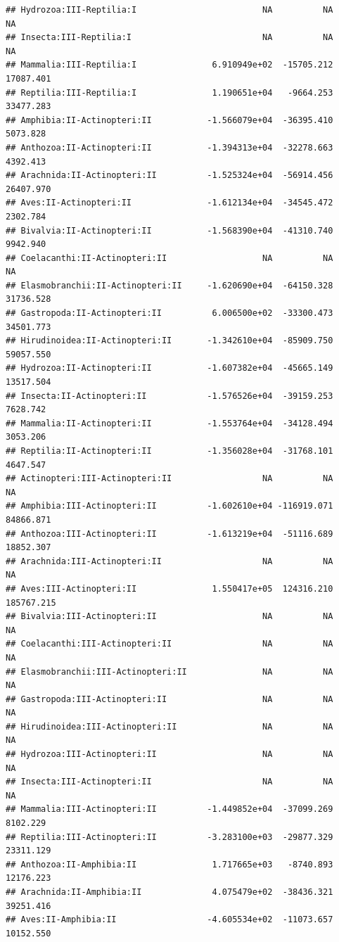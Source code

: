 \documentclass[
  12pt,
]{article}
\begin{document}
\begin{verbatim}
## Hydrozoa:III-Reptilia:I                         NA          NA          NA
## Insecta:III-Reptilia:I                          NA          NA          NA
## Mammalia:III-Reptilia:I               6.910949e+02  -15705.212   17087.401
## Reptilia:III-Reptilia:I               1.190651e+04   -9664.253   33477.283
## Amphibia:II-Actinopteri:II           -1.566079e+04  -36395.410    5073.828
## Anthozoa:II-Actinopteri:II           -1.394313e+04  -32278.663    4392.413
## Arachnida:II-Actinopteri:II          -1.525324e+04  -56914.456   26407.970
## Aves:II-Actinopteri:II               -1.612134e+04  -34545.472    2302.784
## Bivalvia:II-Actinopteri:II           -1.568390e+04  -41310.740    9942.940
## Coelacanthi:II-Actinopteri:II                   NA          NA          NA
## Elasmobranchii:II-Actinopteri:II     -1.620690e+04  -64150.328   31736.528
## Gastropoda:II-Actinopteri:II          6.006500e+02  -33300.473   34501.773
## Hirudinoidea:II-Actinopteri:II       -1.342610e+04  -85909.750   59057.550
## Hydrozoa:II-Actinopteri:II           -1.607382e+04  -45665.149   13517.504
## Insecta:II-Actinopteri:II            -1.576526e+04  -39159.253    7628.742
## Mammalia:II-Actinopteri:II           -1.553764e+04  -34128.494    3053.206
## Reptilia:II-Actinopteri:II           -1.356028e+04  -31768.101    4647.547
## Actinopteri:III-Actinopteri:II                  NA          NA          NA
## Amphibia:III-Actinopteri:II          -1.602610e+04 -116919.071   84866.871
## Anthozoa:III-Actinopteri:II          -1.613219e+04  -51116.689   18852.307
## Arachnida:III-Actinopteri:II                    NA          NA          NA
## Aves:III-Actinopteri:II               1.550417e+05  124316.210  185767.215
## Bivalvia:III-Actinopteri:II                     NA          NA          NA
## Coelacanthi:III-Actinopteri:II                  NA          NA          NA
## Elasmobranchii:III-Actinopteri:II               NA          NA          NA
## Gastropoda:III-Actinopteri:II                   NA          NA          NA
## Hirudinoidea:III-Actinopteri:II                 NA          NA          NA
## Hydrozoa:III-Actinopteri:II                     NA          NA          NA
## Insecta:III-Actinopteri:II                      NA          NA          NA
## Mammalia:III-Actinopteri:II          -1.449852e+04  -37099.269    8102.229
## Reptilia:III-Actinopteri:II          -3.283100e+03  -29877.329   23311.129
## Anthozoa:II-Amphibia:II               1.717665e+03   -8740.893   12176.223
## Arachnida:II-Amphibia:II              4.075479e+02  -38436.321   39251.416
## Aves:II-Amphibia:II                  -4.605534e+02  -11073.657   10152.550

\end{verbatim}
\end{document}
